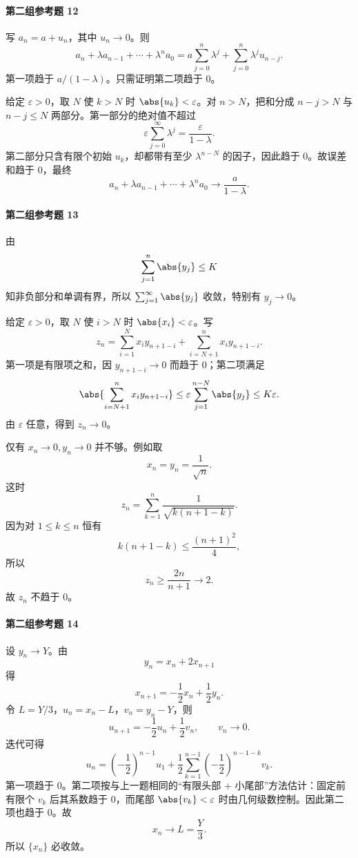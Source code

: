 \paragraph{第二组参考题 12}
\begin{xsolution}
写 $a_n=a+u_n$，其中 $u_n\to0$。则
\[
  a_n+\lambda a_{n-1}+\cdots+\lambda^na_0
  =a\sum_{j=0}^n\lambda^j
   +\sum_{j=0}^n\lambda^ju_{n-j}.
\]
第一项趋于 $a/(1-\lambda)$。只需证明第二项趋于 $0$。

给定 $\varepsilon>0$，取 $N$ 使 $k>N$ 时 $\abs{u_k}<\varepsilon$。对 $n>N$，把和分成 $n-j>N$ 与 $n-j\le N$ 两部分。第一部分的绝对值不超过
\[
  \varepsilon\sum_{j=0}^{\infty}\lambda^j
  =\frac{\varepsilon}{1-\lambda}.
\]
第二部分只含有限个初始 $u_k$，却都带有至少 $\lambda^{n-N}$ 的因子，因此趋于 $0$。故误差和趋于 $0$，最终
\[
  \boxed{a_n+\lambda a_{n-1}+\cdots+\lambda^na_0
  \to\frac a{1-\lambda}}.
\]
\end{xsolution}

\paragraph{第二组参考题 13}
\begin{xsolution}
由
\[
  \sum_{j=1}^n\abs{y_j}\le K
\]
知非负部分和单调有界，所以 $\sum_{j=1}^{\infty}\abs{y_j}$ 收敛，特别有 $y_j\to0$。

给定 $\varepsilon>0$，取 $N$ 使 $i>N$ 时 $\abs{x_i}<\varepsilon$。写
\[
  z_n=\sum_{i=1}^Nx_i y_{n+1-i}
      +\sum_{i=N+1}^n x_i y_{n+1-i}.
\]
第一项是有限项之和，因 $y_{n+1-i}\to0$ 而趋于 $0$；第二项满足
\[
  \abs{\sum_{i=N+1}^n x_i y_{n+1-i}}
  \le\varepsilon\sum_{j=1}^{n-N}\abs{y_j}
  \le K\varepsilon.
\]
由 $\varepsilon$ 任意，得到 $z_n\to0$。

仅有 $x_n\to0,y_n\to0$ 并不够。例如取
\[
  x_n=y_n=\frac1{\sqrt n}.
\]
这时
\[
  z_n=\sum_{k=1}^n\frac1{\sqrt{k(n+1-k)}}.
\]
因为对 $1\le k\le n$ 恒有
\[
  k(n+1-k)\le\frac{(n+1)^2}{4},
\]
所以
\[
  z_n\ge\frac{2n}{n+1}\to2.
\]
故 $z_n$ 不趋于 $0$。
\end{xsolution}

\paragraph{第二组参考题 14}
\begin{xsolution}
设 $y_n\to Y$。由
\[
  y_n=x_n+2x_{n+1}
\]
得
\[
  x_{n+1}=-\frac12x_n+\frac12y_n.
\]
令 $L=Y/3$，$u_n=x_n-L$，$v_n=y_n-Y$，则
\[
  u_{n+1}=-\frac12u_n+\frac12v_n,
  \qquad v_n\to0.
\]
迭代可得
\[
  u_n=\left(-\frac12\right)^{n-1}u_1
  +\frac12\sum_{k=1}^{n-1}\left(-\frac12\right)^{n-1-k}v_k.
\]
第一项趋于 $0$。第二项按与上一题相同的“有限头部 + 小尾部”方法估计：固定前有限个 $v_k$ 后其系数趋于 $0$，而尾部 $\abs{v_k}<\varepsilon$ 时由几何级数控制。因此第二项也趋于 $0$。故
\[
  x_n\to L=\frac Y3.
\]
所以 $\{x_n\}$ 必收敛。
\end{xsolution}

